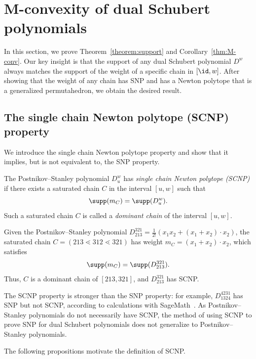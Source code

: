 \section{M-convexity of dual Schubert polynomials}\label{section:Mconvexity}

In this section, we prove Theorem~\ref{theorem:support} and Corollary~\ref{thm:M-conv}. Our key insight is that the support of any dual Schubert polynomial $D^w$ always matches the support of the weight of a specific chain in $[\id,w]$. After showing that the weight of any chain has SNP and has a Newton polytope that is a generalized permutahedron, we obtain the desired result.

\subsection{The single chain Newton polytope (SCNP) property}\label{section:SCNP} 

We introduce the {single chain Newton polytope} property and show that it implies, but is not equivalent to, the SNP property.

\begin{defi} \label{SCNP}
    The Postnikov--Stanley polynomial $D_{u}^w$ has \emph{single chain Newton polytope (SCNP)} if there exists a saturated chain $C$ in the interval $[u, w]$ such that
    \[\supp(m_C) = \supp(D_u^w).\]
    Such a saturated chain $C$ is called a \emph{dominant chain} of the interval $[u, w]$.
\end{defi}
\begin{exam}
    Given the Postnikov--Stanley polynomial $D_{213}^{321} = \frac{1}{2!}(x_1 x_2 + (x_1 + x_2)\cdot x_2)$, the saturated chain $C = (213 \lessdot 312 \lessdot 321)$ has weight $m_C = (x_1 + x_2)\cdot x_2$, which satisfies 
    \[\supp(m_C) = \supp(D_{213}^{321}).\] 
    Thus, $C$ is a dominant chain of $[213, 321]$, and $D_{213}^{321}$ has SCNP. 
\end{exam}

\begin{rema}\label{example:13244231}
    The SCNP property is stronger than the SNP property: for example, $D_{1324}^{4231}$ has SNP but not SCNP, according to calculations with SageMath~\cite{sagemath}. As Postnikov--Stanley polynomials do not necessarily have SCNP, the method of using SCNP to prove SNP for dual Schubert polynomials does not generalize to Postnikov--Stanley polynomials. 
\end{rema}

The following propositions motivate the definition of SCNP.

